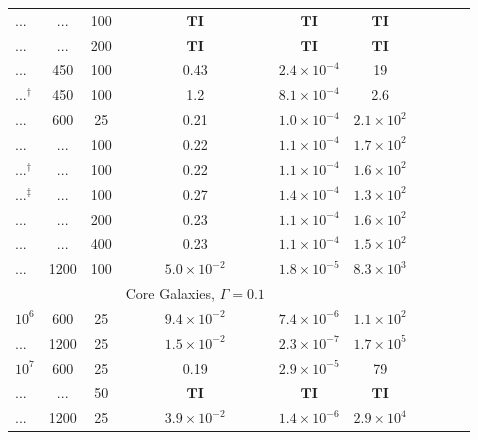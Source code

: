 \documentclass[usenatbib,fleqn]{mn2e}
\begin{document}
\begin{table}
\begin{threeparttable}
\begin{minipage}{18cm}
\begin{tabular}{lccccccccc}
 ... & ... & 100 & $\mathbf{TI}$ & $\mathbf{TI}$ & $\mathbf{TI}$ \\
... & ... & 200 & $\mathbf{TI}$ & $\mathbf{TI}$ & $\mathbf{TI}$ \\
... & 450 & 100 & 0.43 & $ 2.4 \times 10^{ -4 }$ & 19 \\
...$^{\dagger}$ & 450 & 100 & 1.2 & $ 8.1 \times 10^{ -4 }$ & 2.6 \\
... & 600 & 25 & 0.21 & $ 1.0 \times 10^{ -4 }$ & $ 2.1 \times 10^{ 2 }$ \\
... & ... & 100 & 0.22 & $ 1.1 \times 10^{ -4 }$ & $ 1.7 \times 10^{ 2
}$ \\
...$^{\dagger}$ & ... & 100 & 0.22 & $ 1.1 \times 10^{ -4 }$ & $ 1.6 \times 10^{ 2 }$ \\
...$^{\ddagger}$  & ... & 100 & 0.27 & $ 1.4 \times 10^{ -4 }$ & $ 1.3 \times 10^{ 2
}$ \\
... & ... & 200 & 0.23 & $ 1.1 \times 10^{ -4 }$ & $ 1.6 \times 10^{ 2 }$ \\
... & ... & 400 & 0.23 & $ 1.1 \times 10^{ -4 }$ & $ 1.5 \times 10^{ 2 }$ \\
... & 1200 & 100 & $ 5.0 \times 10^{ -2 }$ & $ 1.8 \times 10^{ -5 }$ & $ 8.3 \times 10^{ 3 }$ \\
\hline
& & & Core Galaxies, $\Gamma = 0.1$ & & & & & & \\
$    10^{ 6 }$ & 600 & 25 & $ 9.4 \times 10^{ -2 }$ & $ 7.4 \times 10^{ -6 }$ & $ 1.1 \times 10^{ 2 }$ \\
... & 1200 & 25 & $ 1.5 \times 10^{ -2 }$ & $ 2.3 \times 10^{ -7 }$ & $ 1.7 \times 10^{ 5 }$ \\
$    10^{ 7 }$ & 600 & 25 & 0.19 & $ 2.9 \times 10^{ -5 }$ & 79 \\
... & ... & 50 & $\mathbf{TI}$ & $\mathbf{TI}$ & $\mathbf{TI}$ \\
... & 1200 & 25 & $ 3.9 \times 10^{ -2 }$ & $ 1.4 \times 10^{ -6 }$ & $ 2.9 \times 10^{ 4 }$ \\

\end{tabular}
\end{minipage}
\end{threeparttable}
\end{table}
\end{document}
